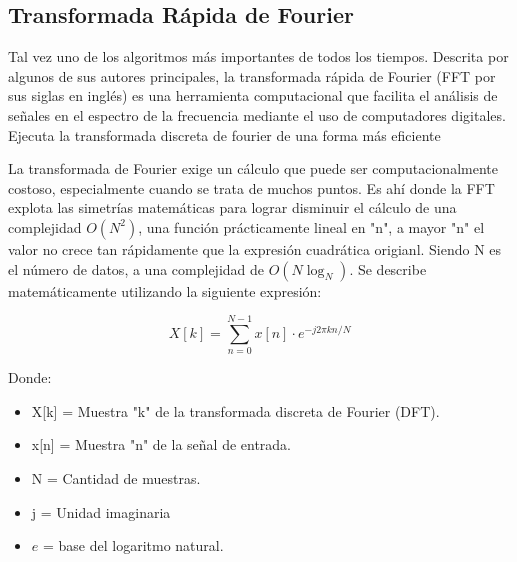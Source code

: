 


\subsection{Transformada Rápida de Fourier} Tal vez uno de los algoritmos más importantes de todos los tiempos. Descrita por algunos de sus autores principales, la transformada rápida de Fourier  (FFT por sus siglas en inglés) es una herramienta computacional que facilita el análisis de señales en el espectro de la frecuencia mediante el uso de computadores digitales. Ejecuta la transformada discreta de fourier de una forma más eficiente 

La transformada de Fourier exige un cálculo que puede ser computacionalmente costoso, especialmente cuando se trata de muchos puntos. Es ahí donde la FFT explota las simetrías matemáticas para lograr disminuir el cálculo de una complejidad $O(N^2)$, una función prácticamente lineal en "n", a mayor "n" el valor no crece tan rápidamente que la expresión cuadrática origianl. Siendo N es el número de datos, a una complejidad de $O(N\log_{N})$. Se describe matemáticamente utilizando la siguiente expresión:

\begin{equation}
    X[k] = \sum_{n=0}^{N-1} x[n] \cdot e^{-j 2 \pi k n / N}
\end{equation}

Donde:

\begin{itemize}
    \item X[k] = Muestra "k" de la transformada discreta de Fourier (DFT).
    \item x[n] = Muestra "n" de la señal de entrada.
    \item N = Cantidad de muestras.
    \item j = Unidad imaginaria
    \item $e$ = base del logaritmo natural.
\end{itemize}

